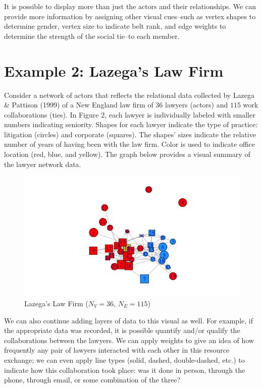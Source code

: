 \documentclass[12pt,twoside]{amherstthesis}
\begin{document}
  It is possible to display more than just the actors and their
  relationships. We can provide more information by assigning other visual
  cues--such as vertex shapes to determine gender, vertex size to indicate
  belt rank, and edge weights to determine the strength of the social
  tie--to each member.
  
  \section{Example 2: Lazega's Law Firm}\label{example-2-lazegas-law-firm}
  
  Consider a network of actors that reflects the relational data collected
  by Lazega \& Pattison (1999) of a New England law firm of \(36\) lawyers
  (actors) and \(115\) work collaborations (ties). In Figure 2, each
  lawyer is individually labeled with smaller numbers indicating
  seniority. Shapes for each lawyer indicate the type of practice:
  litigation (circles) and corporate (squares). The shapes' sizes indicate
  the relative number of years of having been with the law firm. Color is
  used to indicate office location (red, blue, and yellow). The graph
  below provides a visual summary of the lawyer network data.
  
  \begin{figure}[htbp]
  \centering
  \includegraphics{figure/02lawyerplot.png}
  \caption{Lazega's Law Firm (\(N_V = 36\), \(N_E = 115\))}
  \end{figure}
  
  We can also continue adding layers of data to this visual as well. For
  example, if the appropriate data was recorded, it is possible quantify
  and/or qualify the collaborations between the lawyers. We can apply
  weights to give an idea of how frequently any pair of lawyers interacted
  with each other in this resource exchange; we can even apply line types
  (solid, dashed, double-dashed, etc.) to indicate how this collaboration
  took place: was it done in person, through the phone, through email, or
  some combination of the three?
  
\end{document}
